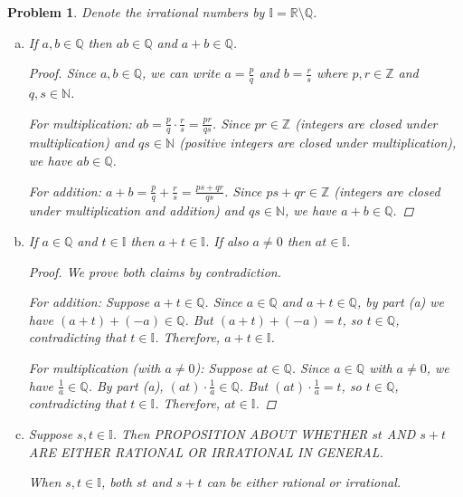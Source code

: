 \documentclass[12pt]{article}
\newtheorem{problem}{Problem}
\newcommand{\QQ}{\ensuremath{\mathbb Q}}
\newcommand{\RR}{\ensuremath{\mathbb R}}
\newcommand{\NN}{\ensuremath{\mathbb N}}
\newcommand{\ZZ}{\ensuremath{\mathbb Z}}
\begin{document}
\begin{problem} %
\newcommand{\II}{\mathbb{I}}
Denote the irrational numbers by $\II = \RR \setminus \QQ$.
\begin{enumerate}[(a)]
\item If $a,b\in\QQ$ then $ab\in\QQ$ and $a+b\in\QQ$.

\begin{proof}
Since $a, b \in \QQ$, we can write $a = \frac{p}{q}$ and $b = \frac{r}{s}$ where $p, r \in \ZZ$ and $q, s \in \NN$.

For multiplication: $ab = \frac{p}{q} \cdot \frac{r}{s} = \frac{pr}{qs}$. Since $pr \in \ZZ$ (integers are closed under multiplication) and $qs \in \NN$ (positive integers are closed under multiplication), we have $ab \in \QQ$.

For addition: $a + b = \frac{p}{q} + \frac{r}{s} = \frac{ps + qr}{qs}$. Since $ps + qr \in \ZZ$ (integers are closed under multiplication and addition) and $qs \in \NN$, we have $a + b \in \QQ$.
\end{proof}

\item If $a\in\QQ$ and $t\in\II$ then $a+t\in\II$.  If also $a\neq 0$ then $at\in\II$.

\begin{proof}
We prove both claims by contradiction.

For addition: Suppose $a + t \in \QQ$. Since $a \in \QQ$ and $a + t \in \QQ$, by part (a) we have $(a + t) + (-a) \in \QQ$. But $(a + t) + (-a) = t$, so $t \in \QQ$, contradicting that $t \in \II$. Therefore, $a + t \in \II$.

For multiplication (with $a \neq 0$): Suppose $at \in \QQ$. Since $a \in \QQ$ with $a \neq 0$, we have $\frac{1}{a} \in \QQ$. By part (a), $(at) \cdot \frac{1}{a} \in \QQ$. But $(at) \cdot \frac{1}{a} = t$, so $t \in \QQ$, contradicting that $t \in \II$. Therefore, $at \in \II$.
\end{proof}

\item Suppose $s,t\in\II$.  Then PROPOSITION ABOUT WHETHER $st$ AND $s+t$ ARE EITHER RATIONAL OR IRRATIONAL IN GENERAL.

	When $s, t \in \II$, both $st$ and $s + t$ can be either rational or irrational.


\end{enumerate}
\end{problem}
\end{document}
